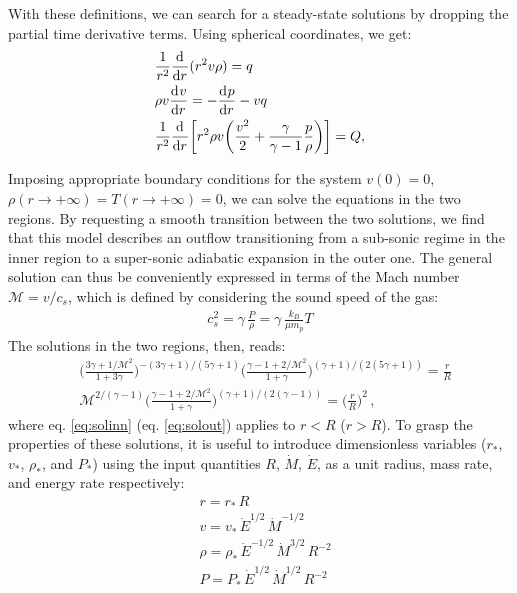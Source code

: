 With these definitions, we can search for a steady-state solutions by dropping the partial time derivative terms. Using spherical coordinates, we get:
\begin{subequations} \label{eq:eul_cc85}
\begin{align}
&\frac{1}{r^2}\frac{\mathrm{d} ^{}}{\mathrm{d} {r}^{}}(r^2v\rho)=q  \label{eq:eul1_cc85}\\
&\rho v\frac{\mathrm{d} ^{}v}{\mathrm{d} {r}^{}}= -\frac{\mathrm{d} ^{}p}{\mathrm{d} {r}^{}} -vq \label{eq:eul2_cc85}\\
&\frac{1}{r^2}\frac{\mathrm{d} ^{}}{\mathrm{d} {r}^{}}\bigg[r^2\rho v\bigg( \frac{v^2}{2}+\frac{\gamma}{\gamma -1}\frac{p}{\rho}\bigg)\bigg]=Q, \label{eq:eul3_cc85}
\end{align}
\end{subequations}

Imposing appropriate boundary conditions for the system $v(0)=0$, $\rho(r\rightarrow+\infty)=T(r\rightarrow+\infty)=0$, we can solve the equations in the two regions. By requesting a smooth transition between the two solutions, we find that this model describes an outflow transitioning from a sub-sonic regime in the inner region to a super-sonic adiabatic expansion in the outer one. The general solution can thus be conveniently expressed in terms of the Mach number $\mathcal{M} = v /c_s$, which is defined by considering the sound speed of the gas:
 \begin{align}
   c_s^2 =\gamma\,\frac{P}{\rho} = \gamma\, \frac{k_B}{\mu m_p} T \label{eq:sound_speed}
 \end{align}
 The solutions in the two regions, then, reads: 
\begin{align}
&\bigg(\frac{3 \gamma + 1/\mathcal{M}^2}{1+3 \gamma}\bigg)^{-(3\gamma+1)/(5 \gamma+1)}\bigg(\frac{\gamma-1+2/\mathcal{M}^2}{1+\gamma}\bigg)^{(\gamma+1)/(2(5\gamma+1))} = \frac{r}{R} \label{eq:solinn}\\
&\mathcal{M}^{2/(\gamma-1)}\bigg(\frac{\gamma-1+2/\mathcal{M}^2}{1+\gamma}\bigg)^{(\gamma+1)/(2(\gamma-1))} = \bigg(\frac{r}{R}\bigg)^2 \label{eq:solout}\,,
\end{align}
where eq. \ref{eq:solinn} (eq. \ref{eq:solout}) applies to $r<R$ ($r>R$). To grasp the properties of these solutions, it is useful to introduce dimensionless variables ($r_*$, $v_*$, $\rho_*$, and $P_*$) using the input quantities $R$, $\dot{M}$, $\dot{E}$, as a unit radius, mass rate, and energy rate respectively:
\begin{subequations} \label{eq:dimensionless_cc85}
\begin{align}
    &r = r_* \,R\\
    &v = v_*\,\dot{E}^{1/2}\,\dot{M}^{-1/2}\\
    &\rho = \rho_*\,\dot{E}^{-1/2}\,\dot{M}^{3/2}\,R^{-2}\\
    &P = P_*\,\dot{E}^{1/2}\,\dot{M}^{1/2}\,R^{-2}
\end{align}
\end{subequations}
